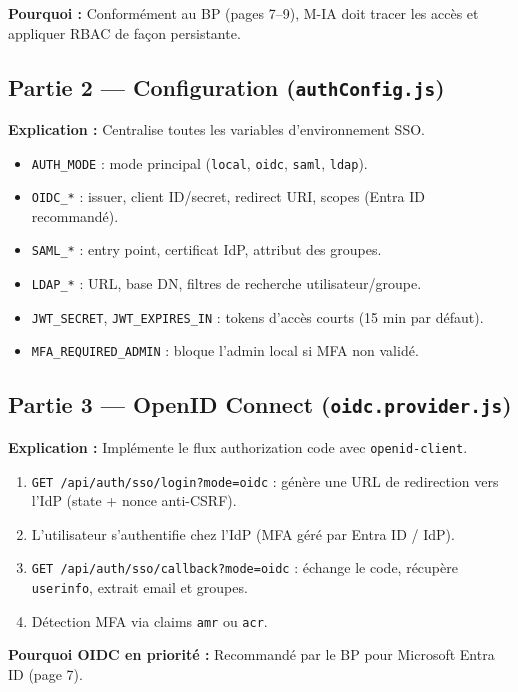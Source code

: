 \documentclass[12pt,a4paper]{article}
\begin{document}
\textbf{Pourquoi :} Conformément au BP (pages 7--9), M-IA doit tracer les accès et appliquer RBAC de façon persistante.

\subsection{Partie 2 --- Configuration (\texttt{authConfig.js})}

\textbf{Explication :} Centralise toutes les variables d'environnement SSO.

\begin{itemize}
  \item \texttt{AUTH\_MODE} : mode principal (\texttt{local}, \texttt{oidc}, \texttt{saml}, \texttt{ldap}).
  \item \texttt{OIDC\_*} : issuer, client ID/secret, redirect URI, scopes (Entra ID recommandé).
  \item \texttt{SAML\_*} : entry point, certificat IdP, attribut des groupes.
  \item \texttt{LDAP\_*} : URL, base DN, filtres de recherche utilisateur/groupe.
  \item \texttt{JWT\_SECRET}, \texttt{JWT\_EXPIRES\_IN} : tokens d'accès courts (15 min par défaut).
  \item \texttt{MFA\_REQUIRED\_ADMIN} : bloque l'admin local si MFA non validé.
\end{itemize}

\subsection{Partie 3 --- OpenID Connect (\texttt{oidc.provider.js})}

\textbf{Explication :} Implémente le flux authorization code avec \texttt{openid-client}.

\begin{enumerate}
  \item \texttt{GET /api/auth/sso/login?mode=oidc} : génère une URL de redirection vers l'IdP (state + nonce anti-CSRF).
  \item L'utilisateur s'authentifie chez l'IdP (MFA géré par Entra ID / IdP).
  \item \texttt{GET /api/auth/sso/callback?mode=oidc} : échange le code, récupère \texttt{userinfo}, extrait email et groupes.
  \item Détection MFA via claims \texttt{amr} ou \texttt{acr}.
\end{enumerate}

\textbf{Pourquoi OIDC en priorité :} Recommandé par le BP pour Microsoft Entra ID (page 7).
\end{document}
